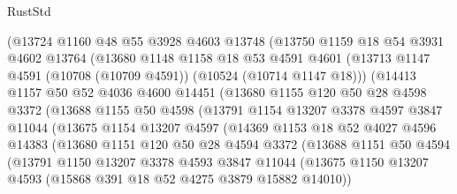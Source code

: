 \begin{lexlean}{RustStd}
\begin{coremodule}
            (@13724
              @1160
              @48
              @55
              @3928
              @4603
              @13748
              (@13750
                @1159
                @18
                @54
                @3931
                @4602
                @13764
                (@13680
                  @1148
                  @1158
                  @18
                  @53
                  @4591
                  @4601
                  (@13713 @1147 @4591 (@10708 (@10709 @4591)) (@10524 (@10714 @1147 @18)))
                  (@14413
                    @1157
                    @50
                    @52
                    @4036
                    @4600
                    @14451
                    (@13680
                      @1155
                      @120
                      @50
                      @28
                      @4598
                      @3372
                      (@13688
                        @1155
                        @50
                        @4598
                        (@13791
                          @1154
                          @13207
                          @3378
                          @4597
                          @3847
                          @11044
                          (@13675
                            @1154
                            @13207
                            @4597
                            (@14369
                              @1153
                              @18
                              @52
                              @4027
                              @4596
                              @14383
                              (@13680
                                @1151
                                @120
                                @50
                                @28
                                @4594
                                @3372
                                (@13688
                                  @1151
                                  @50
                                  @4594
                                  (@13791
                                    @1150
                                    @13207
                                    @3378
                                    @4593
                                    @3847
                                    @11044
                                    (@13675
                                      @1150
                                      @13207
                                      @4593
                                      (@15868 @391 @18 @52 @4275 @3879 @15882 @14010))

\end{coremodule}
\end{lexlean}

